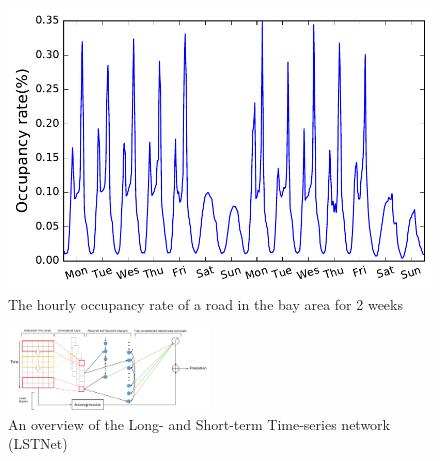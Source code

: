 \begin{figure}[!t]
	\centering
    \includegraphics[width=.3\textwidth]{fig/instance.pdf}
    \caption{The hourly occupancy rate of a road in the bay area for 2 weeks}
    \label{fig:tra-ex}
\end{figure}

\begin{figure}[!t]
	\centering
    \includegraphics[width=0.475\textwidth]{fig/overview.pdf}
    \caption{An overview of the Long- and Short-term Time-series network (LSTNet)}
    \label{fig:overview}
\end{figure}   
    
